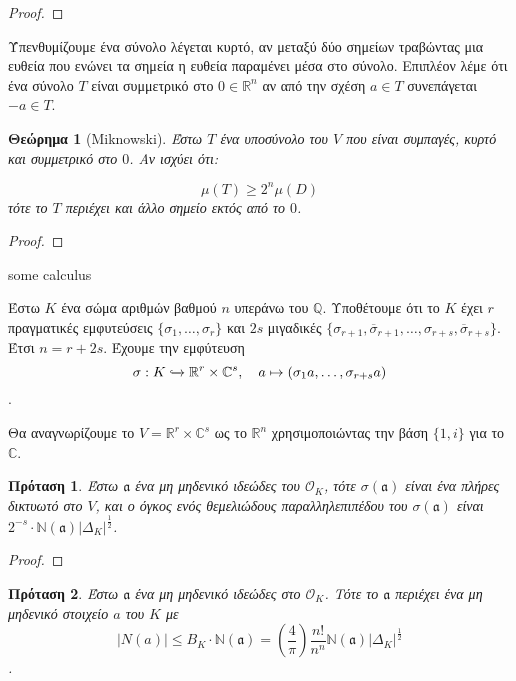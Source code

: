 \documentclass[oneside,a4paper]{article}
\newtheorem{theorem}{Θεώρημα}
\newtheorem{prop}{Πρόταση}
\newcommand {\tl}{\textlatin}
\newcommand{\Q}{\mathbb{Q}}
\begin{document}
\begin{proof}%
\end{proof}

Ύπενθυμίζουμε ένα σύνολο λέγεται κυρτό, αν μεταξύ δύο σημείων τραβώντας μια ευθεία που ενώνει τα σημεία η ευθεία παραμένει μέσα στο σύνολο. Επιπλέον λέμε ότι ένα σύνολο $T$ είναι συμμετρικό στο $0 \in \mathbb{R}^n$ αν από την σχέση $a \in T$ συνεπάγεται $-a \in T$. 



\begin{theorem}[\tl{Miknowski}]
	Έστω $T$ ένα υποσύνολο του $V$ που είναι συμπαγές, κυρτό και συμμετρικό στο $0$. Αν ισχύει ότι:
	
	$$\mu(T) \geq 2^n \mu(D)$$
	τότε το $T$ περιέχει και άλλο σημείο εκτός από το $0$.
\end{theorem}

\begin{proof}
\end{proof}

\tl{some calculus}


\pagebreak


Έστω $K$ ένα σώμα αριθμών βαθμού $n$ υπεράνω του $\Q$. Υποθέτουμε ότι το $K$ έχει $r$ πραγματικές εμφυτεύσεις $\{\sigma_1,\ldots,\sigma_r\}$ και $2s$ μιγαδικές $\{\sigma_{r+1}, \overline{\sigma}_{r+1} ,\ldots, \sigma_{r+s}, \overline{\sigma}_{r+s}\}$. Έτσι $n = r + 2s$. Έχουμε την εμφύτευση 
$$\sigma: K \xhookrightarrow{} \mathbb{R}^r \times \mathbb{C}^s, \quad a \mapsto (\sigma_1 a, \ldots, \sigma_{r+s}a)$$.

Θα αναγνωρίζουμε το $V = \mathbb{R}^r \times \mathbb{C}^s$ ως το $\mathbb{R}^n$ χρησιμοποιώντας την βάση $\{1,i\}$ για το $\mathbb{C}$.

\begin{prop}
	Έστω $\mathfrak{a}$ ένα μη μηδενικό ιδεώδες του $\mathcal{O}_K$, τότε $\sigma(\mathfrak{a})$ είναι ένα πλήρες δικτυωτό στο $V$, και ο όγκος ενός θεμελιώδους παραλληλεπιπέδου του $\sigma(\mathfrak{a})$ είναι $2^{-s}\cdot \mathbb{N}(\mathfrak{a}) |\Delta_K|^{\frac{1}{2}}$.
\end{prop}

\begin{proof}
\end{proof}


\begin{prop}
	Έστω $\mathfrak{a}$ ένα μη μηδενικό ιδεώδες στο $\mathcal{O}_K$. Τότε το $\mathfrak{a}$ περιέχει ένα μη μηδενικό στοιχείο $a$ του $K$ με
	$$|N(a)| \leq B_K \cdot \mathbb{N}(\mathfrak{a}) = \left(\frac{4}{\pi}\right) \frac{n!}{n^n} \mathbb{N}(\mathfrak{a}) |\Delta_K|^{\frac{1}{2}}$$.
\end{prop}
\end{document}
